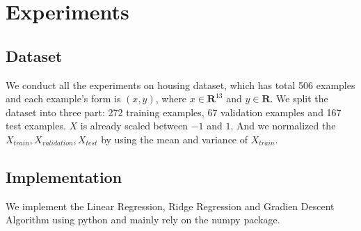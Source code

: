 \documentclass[journal, a4paper]{IEEEtran}
\begin{document}
\section{Experiments}
\subsection{Dataset}
We conduct all the experiments on housing dataset, which has total 506 examples and each example's form is $(x, y)$, where $x \in \mathbf{R}^{13}$ and $y \in \mathbf{R}$. We split the dataset into three part: 272 training examples, 67 validation examples and 167 test examples. $X$ is already scaled between $-1$ and $1$. And we normalized the $X_{train}, X_{validation}, X_{test} $ by using the mean and variance of $X_{train}$. 

\subsection{Implementation}
We implement the Linear Regression, Ridge Regression and Gradien Descent Algorithm using python and mainly rely on the numpy package.
\end{document}
